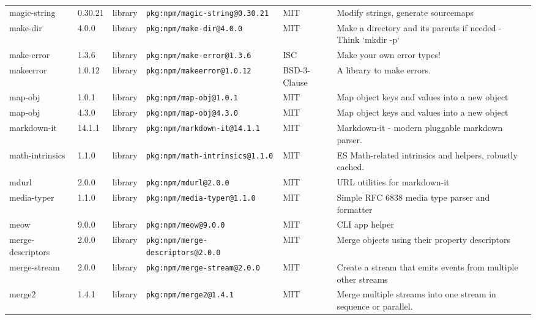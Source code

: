 \documentclass[11pt,a4paper]{article}
\begin{document}
\begin{longtable}{|p{4cm}|p{2cm}|p{1.6cm}|p{5cm}|p{1.5cm}|p{3.5cm}|}
\raggedright magic-string & 0.30.21 & library & \small\texttt{pkg:npm/magic-string@0.30.21} & MIT & \small Modify strings, generate sourcemaps \\
\raggedright make-dir & 4.0.0 & library & \small\texttt{pkg:npm/make-dir@4.0.0} & MIT & \small Make a directory and its parents if needed - Think `mkdir -p` \\
\raggedright make-error & 1.3.6 & library & \small\texttt{pkg:npm/make-error@1.3.6} & ISC & \small Make your own error types! \\
\raggedright makeerror & 1.0.12 & library & \small\texttt{pkg:npm/makeerror@1.0.12} & BSD-3-Clause & \small A library to make errors. \\
\raggedright map-obj & 1.0.1 & library & \small\texttt{pkg:npm/map-obj@1.0.1} & MIT & \small Map object keys and values into a new object \\
\raggedright map-obj & 4.3.0 & library & \small\texttt{pkg:npm/map-obj@4.3.0} & MIT & \small Map object keys and values into a new object \\
\raggedright markdown-it & 14.1.1 & library & \small\texttt{pkg:npm/markdown-it@14.1.1} & MIT & \small Markdown-it - modern pluggable markdown parser. \\
\raggedright math-intrinsics & 1.1.0 & library & \small\texttt{pkg:npm/math-intrinsics@1.1.0} & MIT & \small ES Math-related intrinsics and helpers, robustly cached. \\
\raggedright mdurl & 2.0.0 & library & \small\texttt{pkg:npm/mdurl@2.0.0} & MIT & \small URL utilities for markdown-it \\
\raggedright media-typer & 1.1.0 & library & \small\texttt{pkg:npm/media-typer@1.1.0} & MIT & \small Simple RFC 6838 media type parser and formatter \\
\raggedright meow & 9.0.0 & library & \small\texttt{pkg:npm/meow@9.0.0} & MIT & \small CLI app helper \\
\raggedright merge-descriptors & 2.0.0 & library & \small\texttt{pkg:npm/merge-descriptors@2.0.0} & MIT & \small Merge objects using their property descriptors \\
\raggedright merge-stream & 2.0.0 & library & \small\texttt{pkg:npm/merge-stream@2.0.0} & MIT & \small Create a stream that emits events from multiple other streams \\
\raggedright merge2 & 1.4.1 & library & \small\texttt{pkg:npm/merge2@1.4.1} & MIT & \small Merge multiple streams into one stream in sequence or parallel. \\

\end{longtable}
\end{document}
